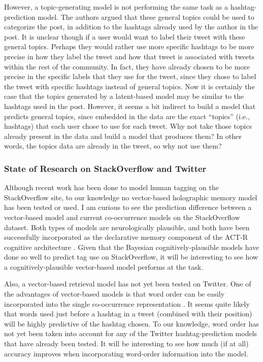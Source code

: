 \documentclass[man,floatsintext,donotrepeattitle]{apa6}
\begin{document}
However, a topic-generating model is not performing the same task as a hashtag-prediction model.
The authors argued that these general topics could be used to categorize the post, in addition to the hashtags already used by the author in the post.
It is unclear though if a user would want to label their tweet with these general topics.
Perhaps they would rather use more specific hashtags to be more precise in how they label the tweet and how that tweet is associated with tweets within the rest of the community.
In fact, they have already chosen to be more precise in the specific labels that they use for the tweet, since they chose to label the tweet with specific hashtags instead of general topics.
Now it is certainly the case that the topics generated by a latent-based model may be similar to the hashtags used in the post.
However, it seems a bit indirect to build a model that predicts general topics, since embedded in the data are the exact ``topics'' (i.e., hashtags) that each user chose to use for each tweet.
Why not take those topics already present in the data and build a model that produces them?
In other words, the topics data are already in the tweet, so why not use them?

\subsubsection{State of Research on StackOverflow and Twitter}

Although recent work has been done to model human tagging on the StackOverflow site, to our knowledge no vector-based holographic memory model has been tested or used.
I am curious to see the prediction difference between a vector-based model and current co-occurrence models on the StackOverflow dataset.
Both types of models are neurologically plausible, and both have been successfully incorporated as the declarative memory component of the ACT-R cognitive architecture \parencite{Rutledge2007}. 
Given that the Bayesian cognitively-plausible models have done so well to predict tag use on StackOverflow, it will be interesting to see how a cognitively-plausible vector-based model performs at the task.

Also, a vector-based retrieval model has not yet been tested on Twitter.
One of the advantages of vector-based models is that word order can be easily incorporated into the single co-occurrence representation \parencite{Jones2007}.
It seems quite likely that words used just before a hashtag in a tweet (combined with their position) will be highly predictive of the hashtag chosen.
To our knowledge, word order has not yet been taken into account for any of the Twitter hashtag-prediction models that have already been tested.
It will be interesting to see how much (if at all) accuracy improves when incorporating word-order information into the model.
\end{document}
